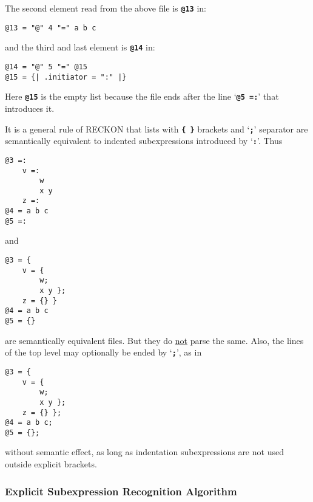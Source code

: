 \documentclass[12pt]{article}
\newcommand{\TT}[1]{{\tt \bfseries #1}}
\newenvironment{indpar}[1][0.3in]%
	{\begin{list}{}%
		     {\setlength{\itemsep}{0in}%
		      \setlength{\topsep}{0in}%
		      \setlength{\parsep}{1ex}%
		      \setlength{\labelwidth}{#1}%
		      \setlength{\leftmargin}{#1}%
		      \addtolength{\leftmargin}{\labelsep}}%
	 \item}%
	{\end{list}}
\begin{document}
The second element read from the above file is \TT{@13} in:

\begin{indpar}\begin{verbatim}
@13 = "@" 4 "=" a b c
\end{verbatim}\end{indpar}

and the third and last element is \TT{@14} in:

\begin{indpar}\begin{verbatim}
@14 = "@" 5 "=" @15
@15 = {| .initiator = ":" |}
\end{verbatim}\end{indpar}

Here \TT{@15} is the empty list because the file ends
after the line `\TT{@5 =:}' that introduces it.

It is a general rule\label{INDENTATION-EQUIVALENCE-RULE}
of RECKON that lists with \TT{\{~\}} brackets
and `\TT{;}' separator are semantically equivalent to indented
subexpressions introduced by `\TT{:}'.  Thus

\begin{indpar}\begin{verbatim}
@3 =:
    v =:
        w
        x y
    z =:
@4 = a b c
@5 =:
\end{verbatim}\end{indpar}

and

\begin{indpar}\begin{verbatim}
@3 = {
    v = {
        w;
        x y };
    z = {} }
@4 = a b c
@5 = {}
\end{verbatim}\end{indpar}

are semantically equivalent files.  But they do \underline{not}
parse the same.  Also, the lines of the top level may optionally
be ended by `\TT{;}', as in

\begin{indpar}\begin{verbatim}
@3 = {
    v = {
        w;
        x y };
    z = {} };
@4 = a b c;
@5 = {};
\end{verbatim}\end{indpar}

without semantic effect, as long as indentation subexpressions
are not used outside explicit brackets.

\subsubsection{Explicit Subexpression Recognition Algorithm}
\label{EXPLICIT-SUBEXPRESSION-RECOGNITION-ALGORITHM}
\end{document}
